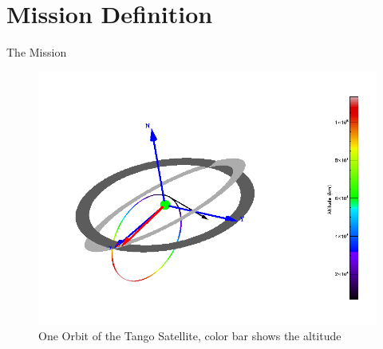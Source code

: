 \section{Mission Definition}
The Mission



\begin{figure}[h]
	\centering
	\includegraphics[width=\linewidth]{spenvis/3d_gei}
		\caption{One Orbit of the Tango Satellite, color bar shows the altitude}
	\label{fig:orbit}
\end{figure}